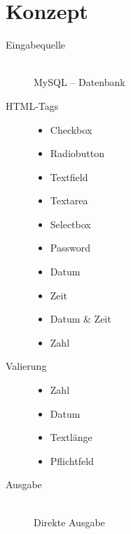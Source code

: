 \documentclass[11pt,a4paper,titlepage,portrait,ngerman,xcolor=dvipsnames]{scrartcl}
\title{\docTitle}
\subtitle{\docSubtitle}
\author{\large\scshape\docAuthor}
\date{\normalsize\scshape\docDate}
\begin{document}
\maketitle
\newpage
\section{Konzept}
\begin{description}
  \item[Eingabequelle] \hfill \\ 
  	MySQL – Datenbank
  	\\
  	
  \item[HTML-Tags] \hfill 
  	\begin{itemize}
  		\item Checkbox
  		\item Radiobutton
  		\item Textfield
  		\item Textarea 
  		\item Selectbox
  		\item Password 
  		\item Datum 
  		\item Zeit
  		\item Datum \& Zeit
  		\item Zahl 
  	\end{itemize} 
  	\hfill 
  
  \item[Valierung] \hfill 
  	\begin{itemize}
  		\item Zahl
  		\item Datum
  		\item Textlänge
  		\item Pflichtfeld
  	\end{itemize} 
  	\hfill
  	
  \item[Ausgabe] \hfill \\
  	Direkte Ausgabe  
  	
\end{description}

 
\end{document}

